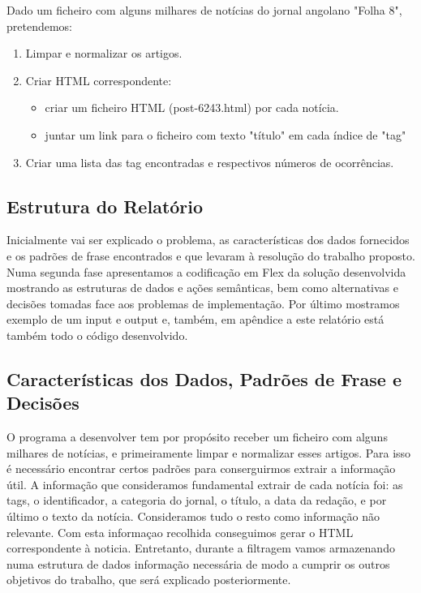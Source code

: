 \documentclass[25pt]{article}
\begin{document}
    Dado um ficheiro com alguns milhares de notícias do jornal angolano "Folha 8",
    pretendemos:
    \begin{enumerate}
    \item Limpar e normalizar os artigos.
    \item Criar HTML correspondente:
      \begin{itemize}
        \item criar um ficheiro HTML (post-6243.html)  por cada notícia.
        \item juntar um link para o ficheiro com texto "título" em cada índice de "tag"
      \end{itemize}
    
    \item Criar uma lista das tag encontradas e respectivos números de ocorrências.
    \end{enumerate}
    \subsection{Estrutura do Relatório}
    Inicialmente vai ser explicado o problema, as características dos dados fornecidos e os padrões de frase
    encontrados e que levaram à resolução do trabalho proposto.
    Numa segunda fase apresentamos a codificação em Flex da solução desenvolvida mostrando as estruturas de dados e
    ações semânticas, bem como alternativas e decisões tomadas face aos problemas de implementação.
    Por último mostramos exemplo de um input e output e, também, em apêndice a este relatório está também todo o código desenvolvido.
    \subsection{Características dos Dados, Padr\~oes de Frase e Decisões}
    O programa a desenvolver tem por propósito receber um ficheiro com alguns milhares de notícias, e primeiramente limpar e normalizar
    esses artigos. Para isso é necessário encontrar certos padrões para conserguirmos extrair a informação útil.
    A informação que consideramos fundamental extrair de cada notícia foi: as tags, o identificador, a
    categoria do jornal, o título, a data da redação, e por último o texto da notícia. Consideramos tudo o resto como informação não relevante. 
    Com esta informaçao recolhida conseguimos gerar o HTML correspondente à noticia. Entretanto, durante a filtragem vamos armazenando 
    numa estrutura de dados informação necessária de modo a cumprir os outros objetivos do trabalho, que será explicado posteriormente.
    \newpage
\end{document}
